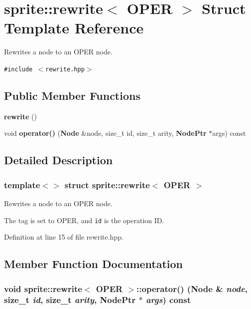 \section{sprite::rewrite$<$ OPER $>$ Struct Template Reference}
\label{structsprite_1_1rewrite_3_01OPER_01_4}
Rewrites a node to an OPER node.  


{\tt \#include $<$rewrite.hpp$>$}

\subsection*{Public Member Functions}
\begin{CompactItemize}
\item 
{\bf rewrite} ()\label{structsprite_1_1rewrite_3_01OPER_01_4_a0}

\item 
void {\bf operator()} ({\bf Node} \&node, size\_\-t id, size\_\-t arity, {\bf Node\-Ptr} $\ast$args) const 
\end{CompactItemize}


\subsection{Detailed Description}
\subsubsection*{template$<$$>$ struct sprite::rewrite$<$ OPER $>$}

Rewrites a node to an OPER node. 

The tag is set to OPER, and {\tt id} is the operation ID. 



Definition at line 15 of file rewrite.hpp.

\subsection{Member Function Documentation}
\subsubsection{\setlength{\rightskip}{0pt plus 5cm}void sprite::rewrite$<$ OPER $>$::operator() ({\bf Node} \& {\em node}, size\_\-t {\em id}, size\_\-t {\em arity}, {\bf Node\-Ptr} $\ast$ {\em args}) const\hspace{0.3cm}{\tt  [inline]}}\label{structsprite_1_1rewrite_3_01OPER_01_4_a1}



